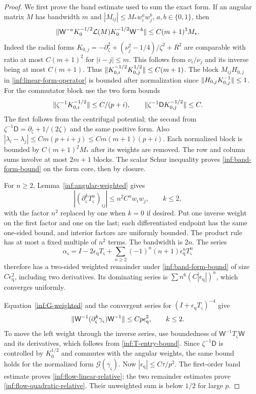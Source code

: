 \begin{proof}
We first prove the band estimate used to sum the exact form.
If an angular matrix $M$ has bandwidth $m$ and
$|M_{ij}|\le M_*w_i^aw_j^b$, $a,b\in\{0,1\}$, then
\begin{equation}\label{inf:band-form-bound}
 \lVert \mathsf W^{-a}K_0^{-1/2}\mathcal L(M)
                K_0^{-1/2}\mathsf W^{-b}\rVert
 \le C(m+1)^3M_*.
\end{equation}
Indeed the radial forms
$K_{0,j}=-\partial_\zeta^2+(\nu_j^2-1/4)/\zeta^2+R^2$
are comparable with ratio at most $C(m+1)^2$ for $|i-j|\le m$.
This follows from $\nu_i/\nu_j$ and its inverse being at most
$C(m+1)$. Thus
$\lVert K_{0,i}^{-1/2}K_{0,j}^{1/2}\rVert\le C(m+1)$.
The block $M_{ij}H_{0,j}$ in \eqref{inf:linear-form-operator}
is bounded after normalization since
$\lVert H_{0,j}K_{0,j}^{-1}\rVert\le1$.
For the commutator block use the two form bounds
\[
 \lVert \zeta^{-1}K_{0,i}^{-1/2}\rVert\le C/(p+i),\qquad
 \lVert \zeta^{-1}\mathsf DK_{0,j}^{-1/2}\rVert\le C.
\]
The first follows from the centrifugal potential; the second from
$\zeta^{-1}\mathsf D=\partial_\zeta+1/(2\zeta)$ and the same
positive form. Also
$|\lambda_i-\lambda_j|\le Cm(p+i+j)\le Cm(m+1)(p+i)$.
Each normalized block is bounded by $C(m+1)^2M_*$ after its
weights are removed. The row and column sums involve at most
$2m+1$ blocks. The scalar Schur inequality proves
\eqref{inf:band-form-bound} on the form core, then by closure.

For $n\ge2$, Lemma~\ref{inf:angular-weighted} gives
\[
 |(\partial_\varsigma^kT_\varsigma^n)_{ij}|\le n^2C^nw_iw_j,\qquad k\le2,
\]
with the factor $n^2$ replaced by one when $k=0$ if desired.
Put one inverse weight on the first factor and one on the last;
each differentiated endpoint has the same one-sided bound, and
interior factors are uniformly bounded. The product rule has at
most a fixed multiple of $n^2$ terms. The bandwidth is $2n$.
The series
\[
 \alpha_\varsigma=I-2\epsilon_{\mathrm q}T_\varsigma
       +\sum_{n\ge2}(-1)^n(n+1)\epsilon_{\mathrm q}^nT_\varsigma^n
\]
therefore has a two-sided weighted remainder under
\eqref{inf:band-form-bound} of size $C\epsilon_{\mathrm q}^2$,
including two derivatives. Its dominating series is
$\sum n^6(C|\epsilon_{\mathrm q}|)^n$, which converges uniformly.

Equation~\eqref{inf:G-weighted} and the convergent series for
$(I+\epsilon_{\mathrm q}T_\varsigma)^{-4}$ give
\[
 \lVert \mathsf W^{-1}(\partial_\varsigma^k\gamma_\varsigma)\mathsf W^{-1}\rVert
 \le Cp\epsilon_{\mathrm q}^2,\qquad k\le2.
\]
To move the left weight through the inverse series, use boundedness
of $\mathsf W^{-1}T_\varsigma\mathsf W$ and its derivatives, which follows
from \eqref{inf:T-entry-bound}. Since
$\zeta^{-1}\mathsf D$ is controlled by $K_0^{1/2}$ and commutes
with the angular weights, the same bound holds for the normalized
form $\mathcal G(\gamma_\varsigma)$.
Now $|\epsilon_{\mathrm q}|\le C\tau/p^2$.
The first-order band estimate proves
\eqref{inf:flow-linear-relative}; the two remainder estimates prove
\eqref{inf:flow-quadratic-relative}.
Their unweighted sum is below $1/2$ for large $p$.


\end{proof}
